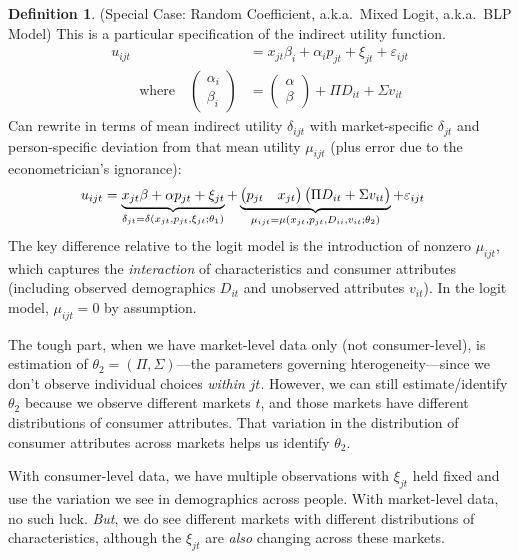 \documentclass[12pt]{article}
\theoremstyle{plain}
\theoremstyle{definition}
\newtheorem{defn}[thm]{Definition}
\theoremstyle{remark}
\begin{document}
\begin{defn}
(Special Case: Random Coefficient, a.k.a.\ Mixed Logit, a.k.a.\ BLP
Model)
This is a particular specification of the indirect utility function.
\begin{align*}
  u_{ijt}
  &= x_{jt}\beta_i + \alpha_ip_{jt} + \xi_{jt} + \varepsilon_{ijt} \\
  \qquad\text{where}\quad
  \begin{pmatrix}
    \alpha_i \\ \beta_i
  \end{pmatrix}
  &=
  \begin{pmatrix}
    \alpha \\ \beta
  \end{pmatrix}
  + \Pi D_{it} + \Sigma v_{it}
\end{align*}
Can rewrite in terms of mean indirect utility $\delta_{ijt}$ with
market-specific $\delta_{jt}$ and person-specific deviation from that
mean utility $\mu_{ijt}$ (plus error due to the econometrician's
ignorance):
\begin{align*}
  u_{ijt} &=
  \underbrace{%
    x_{jt}\beta + \alpha p_{jt} +\xi_{jt}
  }_{\delta_{jt}=\delta(x_{jt},p_{jt},\xi_{jt};\theta_1)}
  +
  \underbrace{%
      \begin{pmatrix}
        p_{jt} & x_{jt}
      \end{pmatrix}
      \begin{pmatrix}
        \Pi D_{it} + \Sigma v_{it}
      \end{pmatrix}
  }_{\mu_{ijt}=\mu(x_{jt},p_{jt},D_{ii},v_{it};\theta_2)}
  +\varepsilon_{ijt}
\end{align*}
The key difference relative to the logit model is the introduction of
nonzero $\mu_{ijt}$, which captures the \emph{interaction} of
characteristics and consumer attributes (including observed demographics
$D_{it}$ and unobserved attributes $v_{it}$).
In the logit model, $\mu_{ijt}=0$ by assumption.

The tough part, when we have market-level data only (not
consumer-level), is estimation of $\theta_2=(\Pi,\Sigma)$---the
parameters governing hterogeneity---since we don't observe individual
choices \emph{within} $jt$.
However, we can still estimate/identify $\theta_2$ because we observe
different markets $t$, and those markets have different distributions
of consumer attributes.
That variation in the distribution of consumer attributes across markets
helps us identify $\theta_2$.

With consumer-level data, we have multiple observations with $\xi_{jt}$
held fixed and use the variation we see in demographics across people.
With market-level data, no such luck.
\emph{But}, we do see different markets with different distributions of
characteristics, although the $\xi_{jt}$ are \emph{also} changing across
these markets.
\end{defn}
\end{document}
